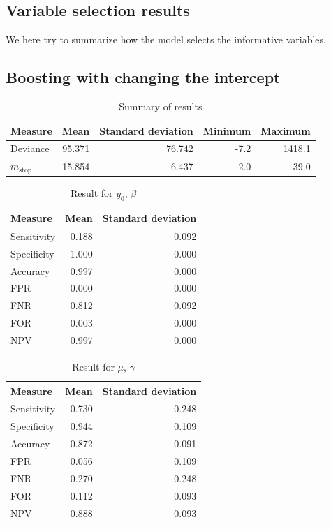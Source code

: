 \subsection{Variable selection results}
We here try to summarize how the model selects the informative variables.

\subsection{Boosting with changing the intercept}

\begin{table}\caption{Summary of results}
\begin{tabular}{l|rrrr}
Measure &   Mean & Standard deviation &  Minimum &    Maximum \\
\hline
Deviance & 95.371 & 76.742 & -7.2 & 1418.1 \\
$m_{\text{stop}}$   & 15.854 &  6.437 &  2.0 &   39.0
\end{tabular}
\end{table}

\begin{table}\caption{Result for $y_0$, $\beta$}
\begin{tabular}{l|rr}
Measure &  Mean &    Standard deviation \\
\hline
Sensitivity & 0.188 & 0.092 \\
Specificity & 1.000 & 0.000 \\
Accuracy    & 0.997 & 0.000 \\
FPR         & 0.000 & 0.000 \\
FNR         & 0.812 & 0.092 \\
FOR         & 0.003 & 0.000 \\
NPV         & 0.997 & 0.000
\end{tabular}
\end{table}


\begin{table}\caption{Result for $\mu$, $\gamma$}
\begin{tabular}{l|rr}
Measure     & Mean   & Standard deviation     \\
\hline
Sensitivity & 0.730 & 0.248 \\
Specificity & 0.944 & 0.109 \\
Accuracy    & 0.872 & 0.091 \\
FPR         & 0.056 & 0.109 \\
FNR         & 0.270 & 0.248 \\
FOR         & 0.112 & 0.093 \\
NPV         & 0.888 & 0.093
\end{tabular}
\end{table}



